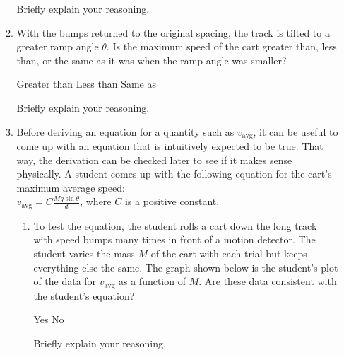 \documentclass{../../../oss-apphys}
\begin{document}
\begin{enumerate}[leftmargin=15pt]
\begin{enumerate}[nosep]
    \vspace{.2in}Briefly explain your reasoning.
    \vspace{.4in}
  \item With the bumps returned to the original spacing, the track is tilted to
    a greater ramp angle $\theta$. Is the maximum speed of the cart greater
    than, less than, or the same as it was when the ramp angle was smaller?

    \vspace{.2in}
    \underline{\hspace{.25in}} Greater than\hspace{.5in}
    \underline{\hspace{.25in}} Less than\hspace{.5in}
    \underline{\hspace{.25in}} Same as

    \vspace{.2in}Briefly explain your reasoning.
    \newpage

  \item Before deriving an equation for a quantity such as $v_\text{avg}$, it
    can be useful to come up with an equation that is intuitively expected to
    be true. That way, the derivation can be checked later to see if it makes
    sense physically. A student comes up with the following equation for the
    cart's maximum average speed:\\
    $\displaystyle v_\text{avg}=C\frac{Mg\sin\theta}{d}$, where $C$ is a
    positive constant.
    \begin{enumerate}[nosep]
    \item To test the equation, the student rolls a cart down the long track
      with speed bumps many times in front of a motion detector. The student
      varies the mass $M$ of the cart with each trial but keeps everything else
      the same. The graph shown below is the student's plot of the data for
      $v_\text{avg}$ as a function of $M$.
      Are these data consistent with the student's equation?

      \vspace{.1in}
      \underline{\hspace{.25in}} Yes\hspace{.5in}
      \underline{\hspace{.25in}} No

      \vspace{.1in}Briefly explain your reasoning.\vspace{.4in}


\end{enumerate}
\end{enumerate}
\end{enumerate}
\end{document}
